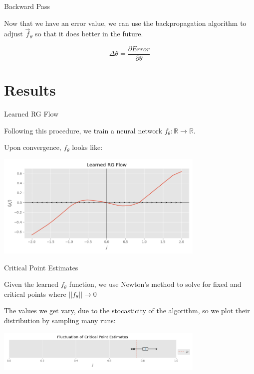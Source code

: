 \documentclass[aspectratio=169, 12pt]{beamer}
\begin{document}
\begin{frame}{Backward Pass}

    Now that we have an error value, we can use the backpropagation algorithm to adjust $\vec{f}_\theta$ so that it does better in the future. 

    \[
    \Delta \theta = \frac{\partial Error}{\partial \theta}
    \]
    
\end{frame}

\section{Results}

\begin{frame}{Learned RG Flow}

    
    Following this procedure, we train a neural network $f_\theta : \mathbb{R} \rightarrow \mathbb{R}$. 

    Upon convergence, $f_\theta$ looks like:

    \begin{center}
        \includegraphics[width=0.75\textwidth]{
            presentation/images/a1_flows.png
        }
    \end{center}
    
\end{frame}

\begin{frame}{Critical Point Estimates}

    
    Given the learned $f_\theta$ function, we use Newton's method to solve for fixed and critical points where $||f_\theta|| \rightarrow 0$
    
    \vspace{1em}

    The values we get vary, due to the stocasticity of the algorithm, so we plot their distribution by sampling many runs:

    \vspace{1em}

    \begin{center}
        \includegraphics[width=0.75\textwidth]{
            presentation/images/a1_critical_points_boxplot.png
        }
    \end{center}
    
\end{frame}
\end{document}
